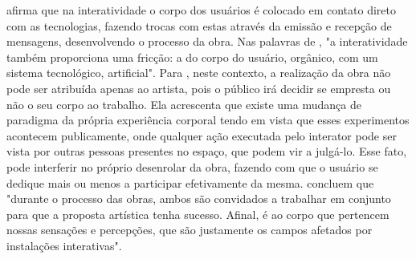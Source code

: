  afirma que na interatividade o corpo dos usuários é colocado em contato direto com as tecnologias, fazendo trocas com estas através da emissão e recepção de mensagens, desenvolvendo o processo da obra. Nas palavras de , "a interatividade também proporciona uma fricção: a do corpo do usuário, orgânico, com um sistema tecnológico, artificial". Para , neste contexto, a realização da obra não pode ser atribuída apenas ao artista, pois o público irá decidir se empresta ou não o seu corpo ao trabalho. Ela acrescenta que existe uma mudança de paradigma da própria experiência corporal tendo em vista que esses experimentos acontecem publicamente, onde qualquer ação executada pelo interator pode ser vista por outras pessoas presentes no espaço, que podem vir a julgá-lo. Esse fato, pode interferir no próprio desenrolar da obra, fazendo com que o usuário se dedique mais ou menos a participar efetivamente da mesma.  concluem que "durante o processo das obras, ambos são convidados a trabalhar em conjunto para que a proposta artística tenha sucesso. Afinal, é ao corpo que pertencem nossas sensações e percepções, que são justamente os campos afetados por instalações interativas".
